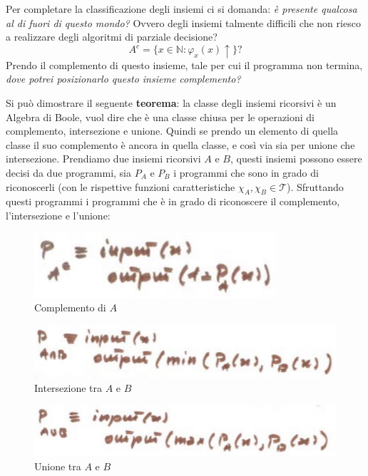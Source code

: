 \documentclass{article}
\begin{document}
Per completare la classificazione degli insiemi ci si domanda: \textit{è presente
qualcosa al di fuori di questo mondo?} Ovvero degli insiemi talmente difficili
che non riesco a realizzare degli algoritmi di parziale decisione?
$$A^c=\{x\in\mathbb{N}:\varphi_x(x)\uparrow\}?$$
Prendo il complemento di questo insieme, tale per cui il programma non termina, \textit{dove
potrei posizionarlo questo insieme complemento?}

Si può dimostrare il seguente \textbf{teorema}: la classe degli insiemi ricorsivi è un Algebra di Boole,
vuol dire che è una classe chiusa per le operazioni di complemento, intersezione e unione. Quindi
se prendo un elemento di quella classe il suo complemento è ancora in quella classe, e così
via sia per unione che intersezione.
Prendiamo due insiemi ricorsivi $A$ e $B$, questi insiemi possono essere decisi da due programmi,
sia $P_A$ e $P_B$ i programmi che sono in grado di riconoscerli (con
le rispettive funzioni caratteristiche $\chi_A,\chi_B\in\mathcal{T}$).
Sfruttando questi programmi i programmi che è in grado di
riconoscere il complemento, l'intersezione e l'unione:
\begin{figure}[H]
    \centering
    \includegraphics[scale=0.6]{images/compl_A.png}
    \caption{Complemento di $A$}
\end{figure}


\begin{figure}[H]
    \centering
    \includegraphics[scale=0.7]{images/intersab.png}
    \caption{Intersezione tra $A$ e $B$}
\end{figure}

\begin{figure}[H]
    \centering
    \includegraphics[scale=0.7]{images/unionab.png}
    \caption{Unione tra $A$ e $B$}
\end{figure}
\end{document}
